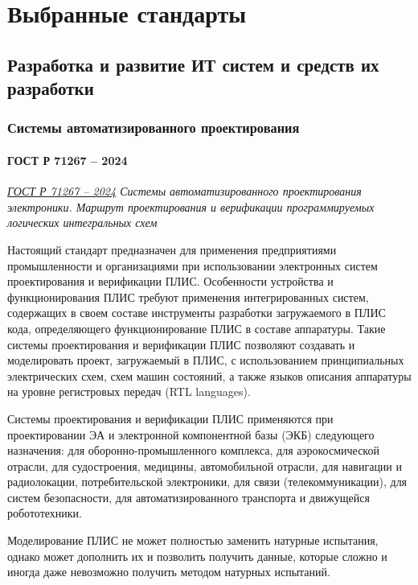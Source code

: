 \clearpage

\section{Выбранные стандарты}

\subsection{Разработка и развитие ИТ систем и средств их разработки}

\subsubsection{Системы автоматизированного проектирования}

\paragraph{ГОСТ Р 71267 -- 2024}

\emph{\href{https://docs.cntd.ru/document/1305118385}{ГОСТ Р 71267 -- 2024}
Системы автоматизированного проектирования электроники.
Маршрут проектирования
и верификации программируемых логических интегральных схем
}

Настоящий стандарт предназначен для применения предприятиями промышленности
и организациями при использовании электронных систем проектирования
и верификации ПЛИС.
Особенности устройства и функционирования
ПЛИС требуют применения интегрированных систем,
содержащих в своем составе инструменты разработки загружаемого в ПЛИС кода,
определяющего функционирование ПЛИС в составе аппаратуры.
Такие системы проектирования и верификации ПЛИС позволяют создавать
и моделировать проект, загружаемый в ПЛИС,
с использованием принципиальных электрических схем, схем машин состояний,
а также языков описания аппаратуры на уровне регистровых передач (RTL languages).

Системы проектирования и верификации ПЛИС применяются при проектировании ЭА
и электронной компонентной базы (ЭКБ) следующего назначения:
для оборонно-промышленного комплекса, для аэрокосмической отрасли,
для судостроения, медицины, автомобильной отрасли,
для навигации и радиолокации, потребительской электроники,
для связи (телекоммуникации), для систем безопасности,
для автоматизированного транспорта и движущейся робототехники.

Моделирование ПЛИС не может полностью заменить натурные испытания,
однако может дополнить их и позволить получить данные,
которые сложно и иногда даже невозможно получить методом натурных испытаний.

